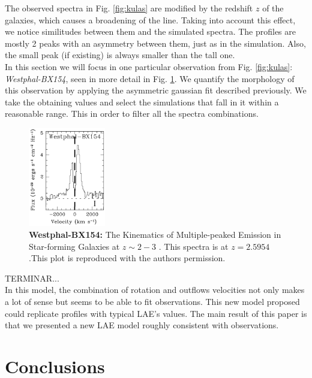 \documentclass[twocolappendix]{latex/emulateapj}
\begin{document}
The observed spectra in Fig. \ref{fig:kulas} are modified by the redshift $z$ of the galaxies, which causes a broadening of the line. Taking into account this effect, we notice similitudes between them and the simulated spectra. The \lya profiles are mostly 2 peaks with an asymmetry between them, just as in the simulation. Also, the small peak (if existing) is always smaller than the tall one.\\

In this section we will focus in one particular observation from Fig. \ref{fig:kulas}: \textit{Westphal-BX154}, seen in more detail in Fig. \ref{fig:kulas_w}. We quantify the morphology of this observation by applying the asymmetric gaussian fit described previously. We take the obtaining values and select the simulations that fall in it within a reasonable range. This in order to filter all the spectra combinations.\\

\begin{figure}[h!]
	\begin{center}
		\includegraphics[width=0.3\textwidth]{./figures/kulas_w}
	\end{center}
	\caption{\textbf{Westphal-BX154:} The Kinematics of Multiple-peaked \lya Emission in Star-forming Galaxies at $z\sim2-3$ \cite{Kulas12}. This spectra is at $z=2.5954$.This plot is reproduced with the authors permission.
		\label{fig:kulas_w}}
\end{figure}

TERMINAR...\\

In this model, the combination of rotation and outflows velocities not only makes a lot of sense but seems to be able to fit observations. This new model proposed could replicate \lya profiles with typical LAE's values. The main result of this paper is that we presented a new LAE model roughly consistent with observations.\\


\section{Conclusions}
\label{sec:conclusions}
\end{document}
